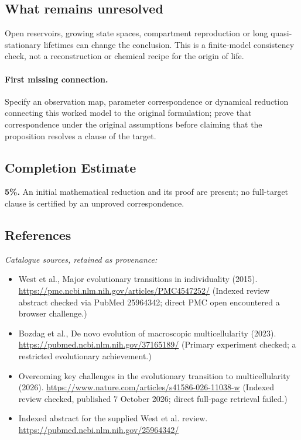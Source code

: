 \documentclass[11pt]{article}
\begin{document}
\subsection{What remains unresolved}
Open reservoirs, growing state spaces, compartment reproduction or long quasi-stationary lifetimes can change the conclusion. This is a finite-model consistency check, not a reconstruction or chemical recipe for the origin of life.
\paragraph{First missing connection.} Specify an observation map, parameter correspondence or dynamical reduction connecting this worked model to the original formulation; prove that correspondence under the original assumptions before claiming that the proposition resolves a clause of the target.
\subsection{Completion Estimate}
\textbf{5\%.} An initial mathematical reduction and its proof are present; no full-target clause is certified by an unproved correspondence.
\subsection{References}
\noindent\emph{Catalogue sources, retained as provenance:}
\begin{itemize}
\item West et al., Major evolutionary transitions in individuality (2015). \url{https://pmc.ncbi.nlm.nih.gov/articles/PMC4547252/} (Indexed review abstract checked via PubMed 25964342; direct PMC open encountered a browser challenge.)
\item Bozdag et al., De novo evolution of macroscopic multicellularity (2023). \url{https://pubmed.ncbi.nlm.nih.gov/37165189/} (Primary experiment checked; a restricted evolutionary achievement.)
\item Overcoming key challenges in the evolutionary transition to multicellularity (2026). \url{https://www.nature.com/articles/s41586-026-11038-w} (Indexed review checked, published 7 October 2026; direct full-page retrieval failed.)
\item Indexed abstract for the supplied West et al. review. \url{https://pubmed.ncbi.nlm.nih.gov/25964342/}
\end{itemize}
\end{document}

